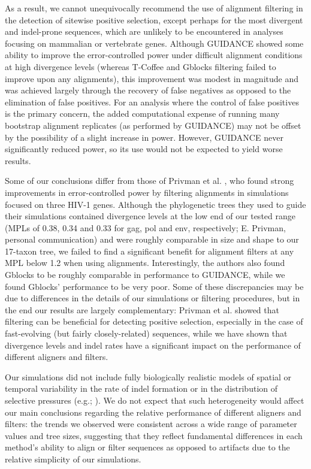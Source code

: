 \documentclass{article}
\begin{document}
As a result, we cannot unequivocally recommend the use of alignment
filtering in the detection of sitewise positive selection, except
perhaps for the most divergent and indel-prone sequences, which are
unlikely to be encountered in analyses focusing on mammalian or
vertebrate genes. Although GUIDANCE showed some ability to improve the
error-controlled power under difficult alignment conditions at high
divergence levels (whereas T-Coffee and Gblocks filtering failed to improve upon
any \prankc alignments), this improvement was modest in magnitude and
was achieved largely through the recovery of false negatives as
opposed to the elimination of false positives. For an analysis where
the control of false positives is the primary concern, the added
computational expense of running many bootstrap alignment replicates
(as performed by GUIDANCE) may not be offset by the possibility of a
slight increase in power. However, GUIDANCE never significantly
reduced power, so its use would not be expected to yield worse
results.

Some of our conclusions differ from those of Privman et
al. \citeyearpar{Privman2011Improving}, who found strong improvements
in error-controlled power by filtering alignments in simulations
focused on three HIV-1 genes. Although the phylogenetic trees they
used to guide their simulations contained divergence levels at the low
end of our tested range (MPLs of 0.38, 0.34 and 0.33 for gag, pol and
env, respectively; E. Privman, personal communication) and were
roughly comparable in size and shape to our 17-taxon tree, we failed
to find a significant benefit for alignment filters at any MPL below
1.2 when using \prankc alignments. Interestingly, the authors also
found Gblocks to be roughly comparable in performance to GUIDANCE,
while we found Gblocks' performance to be very poor. Some of these
discrepancies may be due to differences in the details of our
simulations or filtering procedures, but in the end our results are
largely complementary: Privman et al. showed that filtering can be
beneficial for detecting positive selection, especially in the case of
fast-evolving (but fairly closely-related) sequences, while we have
shown that divergence levels and indel rates have a significant impact
on the performance of different aligners and filters.

Our simulations did not include fully biologically realistic models of
spatial or temporal variability in the rate of indel formation or in
the distribution of selective pressures (e.g.; \citealt{Whelan2008Spatial}). We
do not expect that such heterogeneity would affect our main
conclusions regarding the relative performance of different aligners
and filters: the trends we observed were consistent across a wide
range of parameter values and tree sizes, suggesting that they reflect
fundamental differences in each method's ability to align or filter
sequences as opposed to artifacts due to the relative simplicity of
our simulations.
\end{document}
